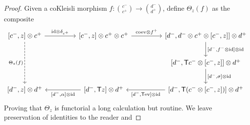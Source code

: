 \documentclass[11pt, oneside, article]{memoir}
\theoremstyle{definition}
\theoremstyle{plain}
\newcommand{\fun}[1]{\mathrm{#1}}%
\newcommand{\Fun}[1]{\mathsf{#1}}%
\newcommand{\id}{\mathrm{id}}
\newcommand{\ev}{\fun{ev}}
\newcommand{\coev}{\fun{coev}}
\newcommand{\inpt}[1]{#1^{-}}
\newcommand{\outp}[1]{#1^{+}}
\newcommand{\lensob}[1]{\binom{\inpt{#1}}{\outp{#1}}}%
\begin{document}
\begin{proof}
Given a coKleisli morphism $f\colon\lensob{c}\to\lensob{d}$, define $\Theta_z(f)$ as the composite
\[
\begin{tikzcd}[column sep=45pt, row sep=22pt, ampersand replacement=\&]
[\inpt c,z]\otimes\outp c\ar[r,"{\id\otimes\delta_{\outp c}}"]\ar[dd, dashed, "\Theta_z(f)"']
\& {[\inpt c,z]\otimes\outp c\otimes\outp c}\ar[r,"\coev\otimes\outp f"]
\& {[\inpt d,\inpt d\otimes\outp c\otimes[\inpt c,z]]\otimes\outp d}\ar[d,"{[\inpt d,\inpt f\otimes\id]\otimes\id}"]
\\
\&
\& {[\inpt d,\Fun{T}\inpt c\otimes[\inpt c,z]]\otimes\outp d}\ar[d,"{[\inpt d,\sigma]\otimes\id}"]
\\
{[\inpt d,z]\otimes\outp d}
\& {[\inpt d,\Fun{T}z]\otimes\outp d}\ar[l,"{[\inpt d,\alpha]\otimes\id}"]
\& {[\inpt d,\Fun{T}(\inpt c\otimes[\inpt c,z])]\otimes\outp d}\ar[l,"{[\inpt d,\Fun{T}\ev]\otimes\id}"]
\end{tikzcd}
\]
Proving that $\Theta_z$ is functorial a long calculation but routine. We leave preservation of identities to the reader and

\end{proof}
\end{document}

